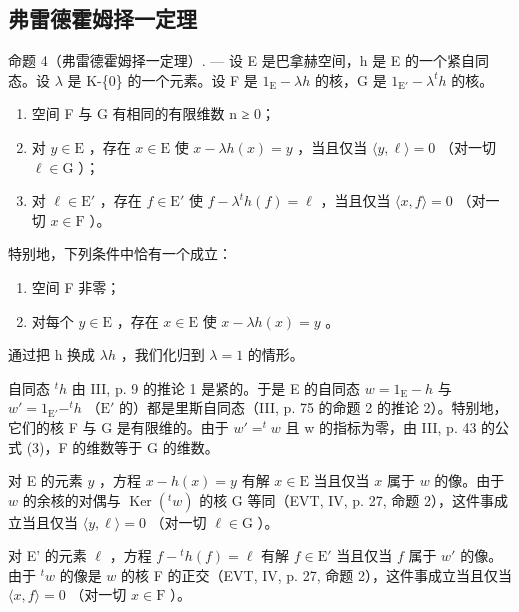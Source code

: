 \subsection{弗雷德霍姆择一定理}

命题 4（弗雷德霍姆择一定理）. --- 设 E 是巴拿赫空间，h 是 E 的一个紧自同态。设 \(\lambda\) 是 K-\{0\} 的一个元素。设 F 是 \(1_{\mathrm{E}} - \lambda h\) 的核，G 是 \(1_{\mathrm{E}'} - \lambda^{t}h\) 的核。

\begin{enumerate}
\def\labelenumi{\alph{enumi})}
\item
  空间 F 与 G 有相同的有限维数 n ≥ 0；
\item
  对 \(y \in \mathrm{E}\) ，存在 \(x \in \mathrm{E}\) 使 \(x - \lambda h(x) = y\) ，当且仅当 \(\langle y, \ell \rangle = 0\) （对一切 \(\ell \in \mathrm{G}\) ）；
\item
  对 \(\ell \in \mathrm{E}'\) ，存在 \(f \in \mathrm{E}'\) 使 \(f - \lambda^t h(f) = \ell\) ，当且仅当 \(\langle x, f \rangle = 0\) （对一切 \(x \in \mathrm{F}\) ）。
\end{enumerate}

特别地，下列条件中恰有一个成立：

\begin{enumerate}
\def\labelenumi{(\roman{enumi})}
\item
  空间 F 非零；
\item
  对每个 \(y \in \mathrm{E}\) ，存在 \(x \in \mathrm{E}\) 使 \(x - \lambda h(x) = y\) 。
\end{enumerate}

通过把 h 换成 \(\lambda h\) ，我们化归到 \(\lambda = 1\) 的情形。

自同态 \(^{t}h\) 由 III, p. 9 的推论 1 是紧的。于是 E 的自同态 \(w = 1_{\mathrm{E}} - h\) 与 \(w' = 1_{\mathrm{E}'} - ^{t}h\) （\(\mathrm{E}'\) 的）都是里斯自同态（III, p. 75 的命题 2 的推论 2）。特别地，它们的核 F 与 G 是有限维的。由于 \(w' = ^{t}w\) 且 w 的指标为零，由 III, p. 43 的公式 (3)，F 的维数等于 G 的维数。

对 E 的元素 \(y\) ，方程 \(x - h(x) = y\) 有解 \(x \in \mathrm{E}\) 当且仅当 \(x\) 属于 \(w\) 的像。由于 \(w\) 的余核的对偶与 \(\operatorname{Ker}(^t w)\) 的核 G 等同（EVT, IV, p. 27, 命题 2），这件事成立当且仅当 \(\langle y, \ell \rangle = 0\) （对一切 \(\ell \in \mathrm{G}\) ）。

对 E' 的元素 \(\ell\) ，方程 \(f - {}^t h(f) = \ell\) 有解 \(f \in \mathrm{E}'\) 当且仅当 \(f\) 属于 \(w'\) 的像。由于 \({}^t w\) 的像是 \(w\) 的核 F 的正交（EVT, IV, p. 27, 命题 2），这件事成立当且仅当 \(\langle x, f \rangle = 0\) （对一切 \(x \in \mathrm{F}\) ）。


